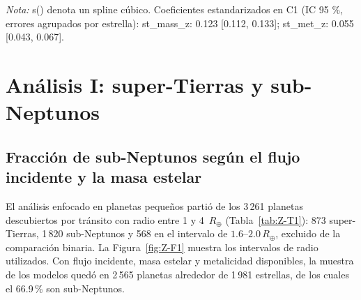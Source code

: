 \begin{table}[htbp]
    \centering
    \caption{Análisis I: verificación con el radio como variable continua. Respuesta: logaritmo del radio planetario.}
    \label{tab:A1-T8}
    \small
    \par\smallskip
    {\footnotesize\textit{Nota:} s() denota un spline cúbico. Coeficientes estandarizados en C1 (IC 95 \%, errores agrupados por estrella): st\_mass\_z: 0.123 [0.112, 0.133]; st\_met\_z: 0.055 [0.043, 0.067].}
\end{table}

\section{Análisis I: super-Tierras y sub-Neptunos}
\label{sec:res-zoom}

\subsection{Fracción de sub-Neptunos según el flujo incidente y la masa estelar}
\label{sec:res-zoom-fracciones}

El análisis enfocado en planetas pequeños partió de los 3\,261 planetas descubiertos por tránsito con radio entre 1 y 4~$R_\oplus$ (Tabla~\ref{tab:Z-T1}): 873 super-Tierras, 1\,820 sub-Neptunos y 568 en el intervalo de $1.6$--$2.0\,R_{\oplus}$, excluido de la comparación binaria. La Figura~\ref{fig:Z-F1} muestra los intervalos de radio utilizados. Con flujo incidente, masa estelar y metalicidad disponibles, la muestra de los modelos quedó en 2\,565 planetas alrededor de 1\,981 estrellas, de los cuales el 66.9\,\% son sub-Neptunos.

